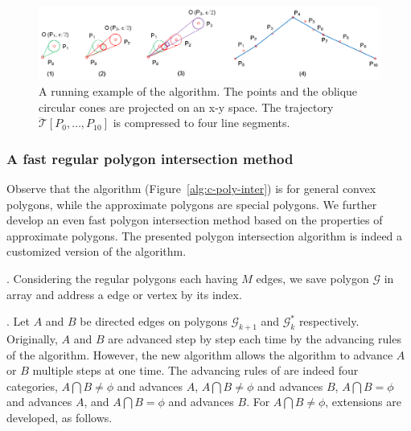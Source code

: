 \begin{figure}[tb!]
\centering
\includegraphics[scale=0.8]{figures/Fig-ex-conest.png}
\vspace{-1ex}
\caption{\small A running example of the \cist algorithm. The points and the oblique circular cones are projected on an x-y space. The trajectory $\dddot{\mathcal{T}}[P_0, \ldots, P_{10}]$ is compressed to four line segments.}
\vspace{-2ex}
\label{fig:exm-const}
\end{figure}



\subsubsection{A fast regular polygon intersection method}


Observe that the \cpia algorithm (Figure~\ref{alg:c-poly-inter}) is for general convex polygons, while the approximate polygons are special polygons. We further develop an even fast polygon intersection method based on the properties of approximate polygons.
%
The presented polygon intersection algorithm is indeed a customized version of the \cpia algorithm.

.
Considering the regular polygons each having $M$ edges, we save polygon $\mathcal{G}$ in array and address a edge or vertex by its index.


.
Let $A$ and $B$ be directed edges on polygons $\mathcal{G}_{k+1}$ and $\mathcal{G}^*_k$ respectively.
Originally, $A$ and $B$ are advanced step by step each time by the advancing rules of the \cpia algorithm.
%
However, the new algorithm allows the algorithm to advance $A$ or $B$ multiple steps at one time.
%
The advancing rules of \cpia are indeed four categories, \ie $A \bigcap B \ne \phi$ and advances $A$, $A \bigcap B \ne \phi$ and advances $B$, $A \bigcap B = \phi$ and advances $A$, and $A \bigcap B = \phi$ and advances $B$.
For $A \bigcap B \ne \phi$, extensions are developed, as follows.



